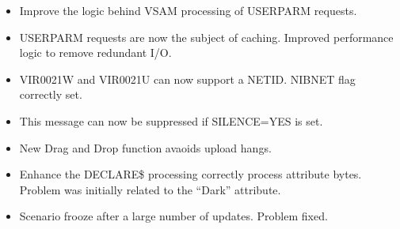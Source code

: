 \documentclass[letterpaper,10pt,english]{sphinxmanual}
\begin{document}
\begin{itemize}
\item {} 
Improve the logic behind VSAM processing of USERPARM requests.

\end{itemize}

\begin{itemize}
\item {} 
USERPARM requests are now the subject of caching. Improved performance logic to remove redundant I/O.

\end{itemize}

\begin{itemize}
\item {} 
VIR0021W and VIR0021U can now support a NETID. NIBNET flag correctly set.

\end{itemize}

\begin{itemize}
\item {} 
This message can now be suppressed if SILENCE=YES is set.

\end{itemize}

\begin{itemize}
\item {} 
New Drag and Drop function avaoids upload hangs.

\end{itemize}

\begin{itemize}
\item {} 
Enhance the DECLARE\$ processing correctly process attribute bytes. Problem was initially related to the “Dark” attribute.

\end{itemize}

\begin{itemize}
\item {} 
Scenario frooze after a large number of updates. Problem fixed.

\end{itemize}
\end{document}
